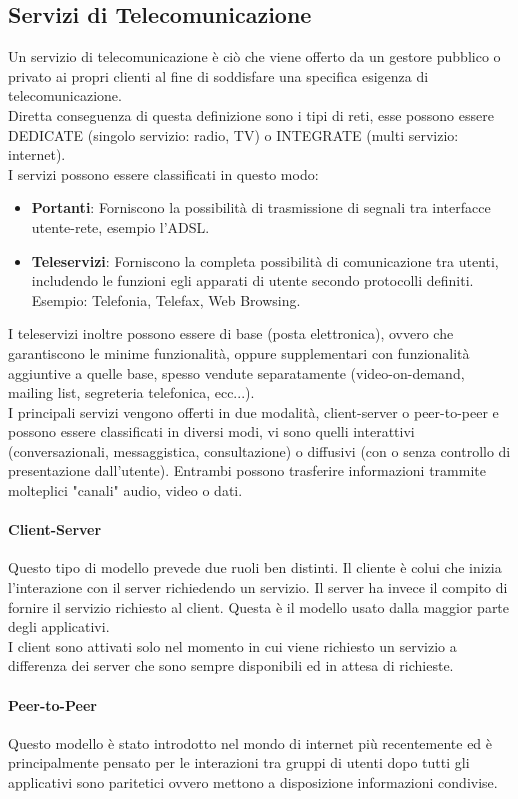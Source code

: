\documentclass[12pt]{article}
\begin{document}
\subsection{Servizi di Telecomunicazione}
Un servizio di telecomunicazione è ciò che viene offerto da un gestore pubblico o privato ai propri clienti al fine di soddisfare una specifica esigenza di telecomunicazione.\\
Diretta conseguenza di questa definizione sono i tipi di reti, esse possono essere DEDICATE (singolo servizio: radio, TV) o INTEGRATE (multi servizio: internet).\\
I servizi possono essere classificati in questo modo:
\begin{itemize}
  \item \textbf{Portanti}: Forniscono la possibilità di trasmissione di segnali tra interfacce utente-rete, esempio l'ADSL.
  \item \textbf{Teleservizi}: Forniscono la completa possibilità di comunicazione tra utenti, includendo le funzioni egli apparati di utente secondo protocolli definiti. Esempio: Telefonia, Telefax, Web Browsing.
\end{itemize}
I teleservizi inoltre possono essere di base (posta elettronica), ovvero che garantiscono le minime funzionalità, oppure supplementari con funzionalità aggiuntive a quelle base, spesso vendute separatamente (video-on-demand, mailing list, segreteria telefonica, ecc...).\\
I principali servizi vengono offerti in due modalità, client-server o peer-to-peer e possono essere classificati in diversi modi, vi sono quelli interattivi (conversazionali, messaggistica, consultazione) o diffusivi (con o senza controllo di presentazione dall'utente). Entrambi possono trasferire informazioni trammite molteplici "canali" audio, video o dati.
\paragraph{Client-Server}
Questo tipo di modello prevede due ruoli ben distinti. Il cliente è colui che inizia l'interazione con il server richiedendo un servizio. Il server ha invece il compito di fornire il servizio richiesto al client. Questa è il modello usato dalla maggior parte degli applicativi.\\
I client sono attivati solo nel momento in cui viene richiesto un servizio a differenza dei server che sono sempre disponibili ed in attesa di richieste.
\paragraph{Peer-to-Peer}
Questo modello è stato introdotto nel mondo di internet più recentemente ed è principalmente pensato per le interazioni tra gruppi di utenti dopo tutti gli applicativi sono paritetici ovvero mettono a disposizione informazioni condivise.
\end{document}
